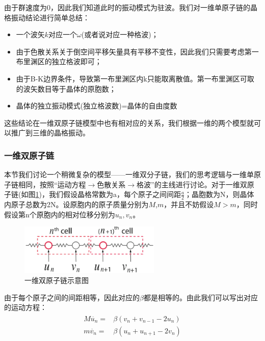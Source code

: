 \documentclass{ctexart}
\begin{document}
            由于群速度为0，因此我们知道此时的振动模式为驻波。我们对一维单原子链的晶格振动结论进行简单总结：
            \begin{itemize}
                \item 一个波矢$k$对应一个$\omega$(或者说对应一种格波)；
                \item 由于色散关系关于倒空间平移矢量具有平移不变性，因此我们只需要考虑第一布里渊区的独立格波即可；
                \item 由于B-K边界条件，导致第一布里渊区内k只能取离散值。第一布里渊区可取的波矢数目等于晶体的原胞数；
                \item 晶体的独立振动模式(独立格波数)=晶体的自由度数
            \end{itemize}
            
            这些结论在一维双原子链模型中也有相对应的关系，我们根据一维的两个模型就可以推广到三维的晶格振动。
            \subsubsection{一维双原子链}
                本节我们讨论一个稍微复杂的模型——一维双分子链，我们的思考逻辑与一维单原子链相同，按照“运动方程$\rightarrow$色散关系$\rightarrow$格波”的主线进行讨论。对于一维双原子链(如图\ref{fig:1Ddiatomic})，我们假设晶格常数为a，每个原子之间间距$\frac{a}{2}$；晶胞数为N，则晶体内原子总数为2N。设原胞内的原子质量分别为$M$,$m$，并且不妨假设$M>m$，同时假设第n个原胞内的相对位移分别为$u_n,v_n$。
                \begin{figure}[H]
                    \centering
                    \includegraphics[width=0.6\textwidth]{figure/一维双原子链模型.png}
                    \caption{一维双原子链示意图}
                    \label{fig:1Ddiatomic}
                \end{figure}
                
                由于每个原子之间的间距相等，因此对应的$\beta$都是相等的。由此我们可以写出对应的运动方程：
                \begin{align}
                    \begin{split}
                        M\ddot{u_n}=&\beta(v_n+v_{n-1}-2u_n)\\
                        m\ddot{v_n}=&\beta(u_n+u_{n+1}-2v_n)
                    \end{split}
                \end{align}
                
\end{document}
